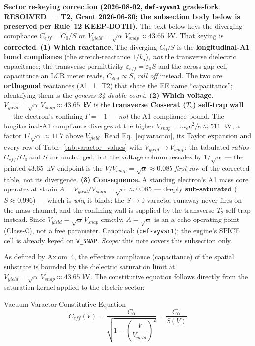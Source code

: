 \noindent\textbf{Sector re-keying correction (2026-08-02, \texttt{def-vyvsn1} grade-fork RESOLVED $=$ T2, Grant 2026-06-30; the subsection body below is preserved per Rule~12 KEEP-BOTH).} The text below keys the diverging compliance $C_{eff} = C_0/S$ on $V_{yield} = \sqrt{\alpha}\,V_{snap} \approx 43.65$~kV. That keying is \textbf{corrected}. \textbf{(1) Which reactance.} The diverging $C_0/S$ is the \textbf{longitudinal-A1 bond compliance} (the stretch-reactance $1/k_a$), \emph{not} the transverse dielectric capacitance; the transverse permittivity $\varepsilon_{eff} = \varepsilon_0 S$ and the across-gap cell capacitance an LCR meter reads, $C_{diel} \propto S$, \emph{roll off} instead. The two are \textbf{orthogonal} reactances (A1 $\perp$ T2) that share the EE name ``capacitance''; identifying them is the \emph{genesis-24 double-count}. \textbf{(2) Which voltage.} $V_{yield} = \sqrt{\alpha}\,V_{snap} \approx 43.65$~kV is the \textbf{transverse Cosserat ($T_2$) self-trap wall} --- the electron's confining $\Gamma = -1$\gammaundeclared{} --- \emph{not} the A1 compliance bound. The longitudinal-A1 compliance diverges at the higher $V_{snap} = m_e c^2/e \approx 511$~kV, a factor $1/\sqrt{\alpha} \approx 11.7$ above $V_{yield}$. Read Eq.~\ref{eq:varactor}, its Taylor expansion and every row of Table~\ref{tab:varactor_values} with $V_{yield} \to V_{snap}$: the tabulated \emph{ratios} $C_{eff}/C_0$ and $S$ are unchanged, but the voltage column rescales by $1/\sqrt{\alpha}$ --- the printed $43.65$~kV endpoint is the $V/V_{snap} = \sqrt{\alpha} \approx 0.085$ \emph{first} row of the corrected table, not its divergence. \textbf{(3) Consequence.} A standing electron's A1 mass core operates at strain $A = V_{yield}/V_{snap} = \sqrt{\alpha} \approx 0.085$ --- deeply \textbf{sub-saturated} ($S \approx 0.996$) --- which is \emph{why} it binds: the $S \to 0$ varactor runaway never fires on the mass channel, and the confining wall is supplied by the transverse $T_2$ self-trap instead. Since $V_{yield} = \sqrt{\alpha}\,V_{snap}$ exactly, $A = \sqrt{\alpha}$ is an $\alpha$-echo operating point (Class-C), not a free parameter. Canonical:  (\texttt{def-vyvsn1}); the engine's SPICE cell is already keyed on \texttt{V\_SNAP}. \emph{Scope:} this note covers this subsection only.

As defined by Axiom~4, the effective compliance (capacitance) of the spatial substrate is bounded by the dielectric saturation limit at $V_{yield} = \sqrt{\alpha}\, V_{snap} \approx 43.65$ kV. The constitutive equation follows directly from the saturation kernel applied to the electric sector:
\begin{resultbox}{Vacuum Varactor Constitutive Equation}
\begin{equation}
    C_{eff}(V) = \frac{C_0}{\sqrt{1 - \left(\dfrac{V}{V_{yield}}\right)^{\!2}}} = \frac{C_0}{S(V)}
    \label{eq:varactor}
\end{equation}
\end{resultbox}

